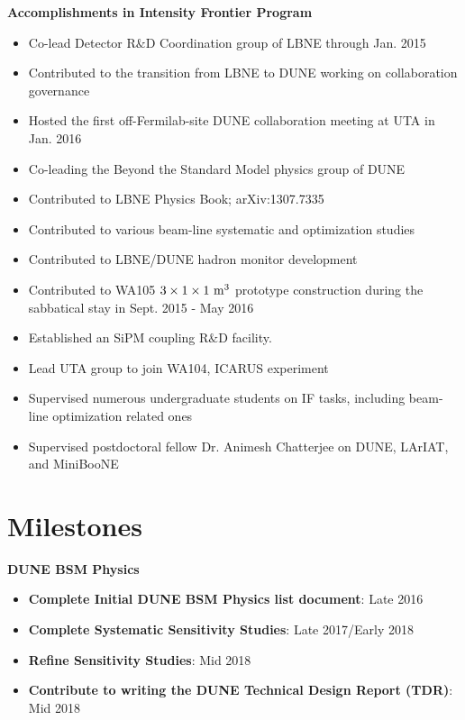 \noindent\textbf{Accomplishments in Intensity Frontier Program}
\begin{itemize}[noitemsep,nolistsep]
\item{Co-lead Detector R$\&$D Coordination group of LBNE through Jan. 2015}
\item{Contributed to the transition from LBNE to DUNE working on collaboration governance}
\item{Hosted the first off-Fermilab-site DUNE collaboration meeting at UTA in Jan. 2016}
\item{Co-leading the Beyond the Standard Model physics group of DUNE}
\item{Contributed to LBNE Physics Book; arXiv:1307.7335}
\item{Contributed to various beam-line systematic and optimization studies}
\item{Contributed to LBNE/DUNE hadron monitor development}
\item{Contributed to WA105 $3\times 1 \times 1~{\rm m^{3}}$ prototype construction during the sabbatical stay in Sept. 2015 - May 2016}
\item{Established an SiPM coupling R$\&$D facility.}
\item{Lead UTA group to join WA104, ICARUS experiment}
\item {Supervised numerous undergraduate students on IF tasks, including beam-line optimization related ones}
\item {Supervised postdoctoral fellow Dr. Animesh Chatterjee on DUNE, LArIAT, and MiniBooNE}
\end{itemize}

\section*{\textbf{Milestones}}
\noindent\textbf{DUNE BSM Physics}
\begin{itemize}[noitemsep,nolistsep]
\item{\textbf{Complete Initial DUNE BSM Physics list document}}: Late 2016
\item{\textbf{Complete Systematic Sensitivity Studies}}: Late 2017/Early 2018
\item{\textbf{Refine Sensitivity Studies}}: Mid 2018
\item{\textbf{Contribute to writing the DUNE Technical Design Report (TDR)}}: Mid 2018
\end{itemize}

